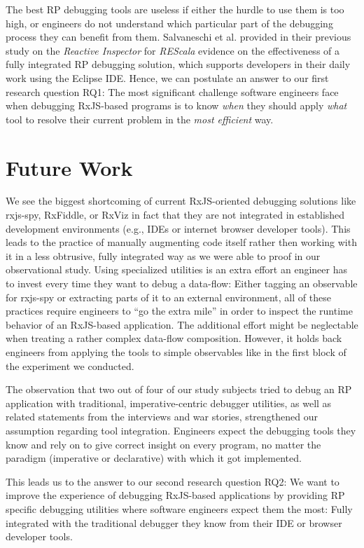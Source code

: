 \documentclass[sigplan,screen,review]{acmart}
\begin{document}
The best RP debugging tools are useless if either the hurdle to use them is too high, or engineers do not understand which particular part of the debugging process they can benefit from them. Salvaneschi et al. \cite{10.1145/2884781.2884815} provided in their previous study on the \emph{Reactive Inspector} for \emph{REScala} evidence on the effectiveness of a fully integrated RP debugging solution, which supports developers in their daily work using the Eclipse IDE. Hence, we can postulate an answer to our first research question RQ1: The most significant challenge software engineers face when debugging RxJS-based programs is to know \emph{when} they should apply \emph{what} tool to resolve their current problem in the \emph{most efficient} way.

\section{Future Work}
\label{sec:future}

We see the biggest shortcoming of current RxJS-oriented debugging solutions like rxjs-spy, RxFiddle, or RxViz in fact that they are not integrated in established development environments (e.g., IDEs or internet browser developer tools). This leads to the practice of manually augmenting code itself rather then working with it in a less obtrusive, fully integrated way as we were able to proof in our observational study. Using specialized utilities is an extra effort an engineer has to invest every time they want to debug a data-flow: Either tagging an observable for rxjs-spy or extracting parts of it to an external environment, all of these practices require engineers to ``go the extra mile'' in order to inspect the runtime behavior of an RxJS-based application. The additional effort might be neglectable when treating a rather complex data-flow composition. However, it holds back engineers from applying the tools to simple observables like in the first block of the experiment we conducted.

The observation that two out of four of our study subjects tried to debug an RP application with traditional, imperative-centric debugger utilities, as well as related statements from the interviews and war stories, strengthened our assumption regarding tool integration. Engineers expect the debugging tools they know and rely on to give correct insight on every program, no matter the paradigm (imperative or declarative) with which it got implemented.

This leads us to the answer to our second research question RQ2: We want to improve the experience of debugging RxJS-based applications by providing RP specific debugging utilities where software engineers expect them the most: Fully integrated with the traditional debugger they know from their IDE or browser developer tools.
\end{document}
